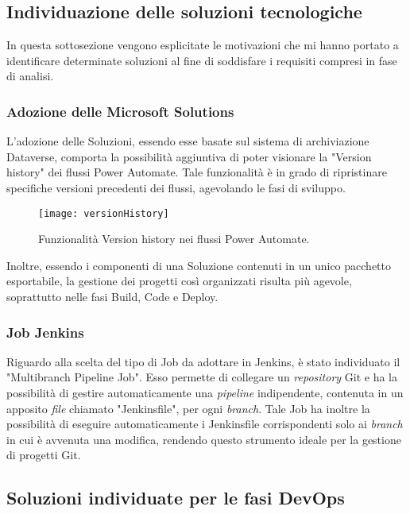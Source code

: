 \subsection{Individuazione delle soluzioni tecnologiche}
In questa sottosezione vengono esplicitate le motivazioni che mi hanno portato a identificare determinate soluzioni al fine di soddisfare i requisiti compresi in fase di analisi.

\subsubsection*{Adozione delle Microsoft Solutions}
\label{progettazioneSolutions}
L'adozione delle Soluzioni, essendo esse basate sul sistema di archiviazione Dataverse, comporta la possibilità aggiuntiva di poter visionare la "Version history" dei flussi Power Automate. Tale funzionalità è in grado di ripristinare specifiche versioni precedenti dei flussi, agevolando le fasi di sviluppo.
\begin{figure}[htbp] 
    \centering 
    \texttt{[image: versionHistory]} 
    \caption{Funzionalità Version history nei flussi Power Automate.}
    \label{fig:versionHistory}
\end{figure}
\newline \noindent Inoltre, essendo i componenti di una Soluzione contenuti in un unico pacchetto esportabile, la gestione dei progetti così organizzati risulta più agevole, soprattutto nelle fasi Build, Code e Deploy. 

\subsubsection*{Job Jenkins}
Riguardo alla scelta del tipo di Job da adottare in Jenkins, è stato individuato il "Multibranch Pipeline Job". Esso permette di collegare un \emph{repository} Git e ha la possibilità di gestire automaticamente una \emph{pipeline} indipendente, contenuta in un apposito \emph{file} chiamato "Jenkinsfile", per ogni \emph{branch}.
Tale Job ha inoltre la possibilità di eseguire automaticamente i Jenkinsfile corrispondenti solo ai \emph{branch} in cui è avvenuta una modifica, rendendo questo strumento ideale per la gestione di progetti Git.\\

\subsection{Soluzioni individuate per le fasi DevOps}
